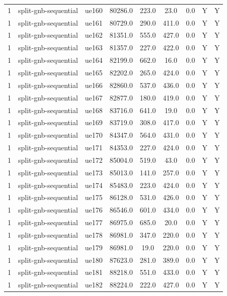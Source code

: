 \begin{table}[ht]
\begin{tabular}{|c|c|c|c|c|c|c|c|c|}
1 & split-gnb-sequential & ue160 & 80286.0 & 223.0 & 23.0 & 0.0 & Y & Y \\
1 & split-gnb-sequential & ue161 & 80729.0 & 290.0 & 411.0 & 0.0 & Y & Y \\
1 & split-gnb-sequential & ue162 & 81351.0 & 555.0 & 427.0 & 0.0 & Y & Y \\
1 & split-gnb-sequential & ue163 & 81357.0 & 227.0 & 422.0 & 0.0 & Y & Y \\
1 & split-gnb-sequential & ue164 & 82199.0 & 662.0 & 16.0 & 0.0 & Y & Y \\
1 & split-gnb-sequential & ue165 & 82202.0 & 265.0 & 424.0 & 0.0 & Y & Y \\
1 & split-gnb-sequential & ue166 & 82860.0 & 537.0 & 436.0 & 0.0 & Y & Y \\
1 & split-gnb-sequential & ue167 & 82877.0 & 180.0 & 419.0 & 0.0 & Y & Y \\
1 & split-gnb-sequential & ue168 & 83716.0 & 641.0 & 19.0 & 0.0 & Y & Y \\
1 & split-gnb-sequential & ue169 & 83719.0 & 308.0 & 417.0 & 0.0 & Y & Y \\
1 & split-gnb-sequential & ue170 & 84347.0 & 564.0 & 431.0 & 0.0 & Y & Y \\
1 & split-gnb-sequential & ue171 & 84353.0 & 227.0 & 424.0 & 0.0 & Y & Y \\
1 & split-gnb-sequential & ue172 & 85004.0 & 519.0 & 43.0 & 0.0 & Y & Y \\
1 & split-gnb-sequential & ue173 & 85013.0 & 141.0 & 257.0 & 0.0 & Y & Y \\
1 & split-gnb-sequential & ue174 & 85483.0 & 223.0 & 424.0 & 0.0 & Y & Y \\
1 & split-gnb-sequential & ue175 & 86128.0 & 531.0 & 426.0 & 0.0 & Y & Y \\
1 & split-gnb-sequential & ue176 & 86546.0 & 601.0 & 434.0 & 0.0 & Y & Y \\
1 & split-gnb-sequential & ue177 & 86975.0 & 685.0 & 20.0 & 0.0 & Y & Y \\
1 & split-gnb-sequential & ue178 & 86981.0 & 347.0 & 220.0 & 0.0 & Y & Y \\
1 & split-gnb-sequential & ue179 & 86981.0 & 19.0 & 220.0 & 0.0 & Y & Y \\
1 & split-gnb-sequential & ue180 & 87623.0 & 281.0 & 389.0 & 0.0 & Y & Y \\
1 & split-gnb-sequential & ue181 & 88218.0 & 551.0 & 433.0 & 0.0 & Y & Y \\
1 & split-gnb-sequential & ue182 & 88224.0 & 222.0 & 427.0 & 0.0 & Y & Y \\

\end{tabular}
\end{table}
